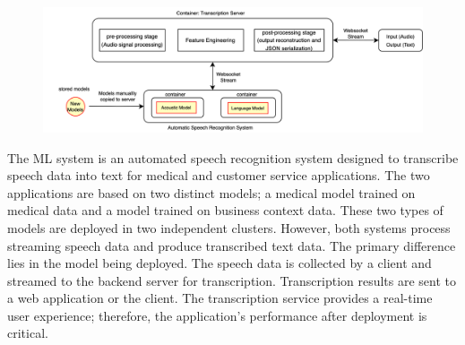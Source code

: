 \DIFaddbegin {}\begin{figure}[b]
\centering
\includegraphics[width=\linewidth]{images/case3_deployment_process.png}
\caption{}
\label{fig: case3_deployment_process}
\end{figure}

\DIFaddend %
\DIFdelbegin %

{%
}
\DIFdelend 

The ML system is an automated speech recognition system designed to transcribe speech data into text for medical and customer service applications. The two applications are based on two distinct models; a medical model trained on medical data and a model trained on business context data. These two types of models are deployed in two independent clusters. However, both systems process streaming speech data and produce transcribed text data. The primary difference lies in the model being deployed. The speech data is collected by a client and streamed to the backend server for transcription. Transcription results are sent to a web application or the client. The transcription service provides a real-time user experience; therefore, the application's performance after deployment is critical.

